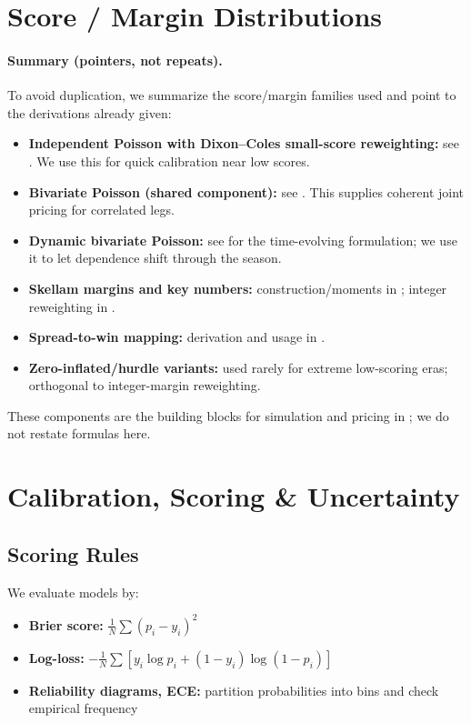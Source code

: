 \section{Score / Margin Distributions}
\label{sec:score}

\paragraph{Summary (pointers, not repeats).} To avoid duplication, we summarize the score/margin families used and point to the derivations already given:
\begin{itemize}
  \item \textbf{Independent Poisson with Dixon--Coles small-score reweighting:} see . We use this for quick calibration near low scores.
  \item \textbf{Bivariate Poisson (shared component):} see . This supplies coherent joint pricing for correlated legs.
  \item \textbf{Dynamic bivariate Poisson:} see  for the time-evolving formulation; we use it to let dependence shift through the season.
  \item \textbf{Skellam margins and key numbers:} construction/moments in ; integer reweighting in .
  \item \textbf{Spread-to-win mapping:} derivation and usage in .
  \item \textbf{Zero-inflated/hurdle variants:} used rarely for extreme low-scoring eras; orthogonal to integer-margin reweighting.
\end{itemize}

These components are the building blocks for simulation and pricing in ; we do not restate formulas here.

\section{Calibration, Scoring \& Uncertainty}
\label{sec:calib}

\subsection{Scoring Rules}
We evaluate models by:
\begin{itemize}
  \item \textbf{Brier score:} \( \frac{1}{N} \sum (p_i - y_i)^2 \)
  \item \textbf{Log-loss:} \( -\frac{1}{N} \sum [y_i \log p_i + (1-y_i)\log(1-p_i)] \)
  \item \textbf{Reliability diagrams, ECE:} partition probabilities into bins and check empirical frequency
\end{itemize}

